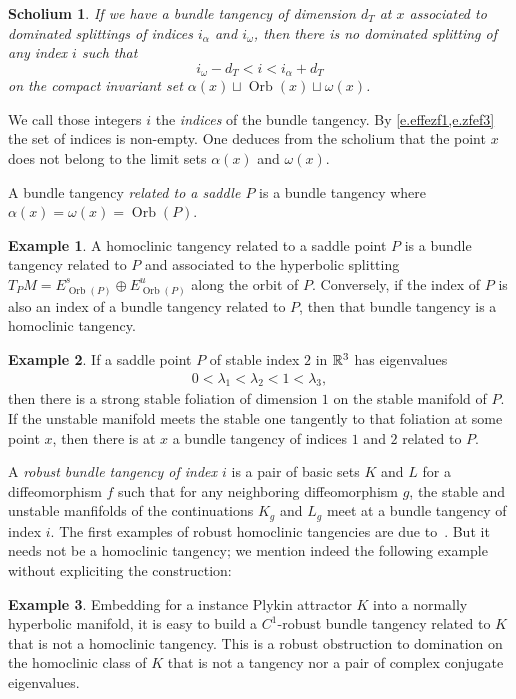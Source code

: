 \documentclass[11pt, a4paper]{amsart}
\theoremstyle{plain}
\newtheorem{scholium}[proposition]{Scholium}
\theoremstyle{definition}
\newtheorem{example}{Example}[proposition]
\theoremstyle{remark}
\numberwithin{equation}{section}         %
\def\Orb{\operatorname{Orb}}
\begin{document}
\begin{scholium}\label{s.gentangency}
If we have a bundle tangency of dimension $d_T$ at $x$ associated to dominated splittings of indices $i_\alpha$ and $i_\omega$, then  there is no dominated splitting of any index $i$ such that 
$$i_\omega-d_T<i<i_\alpha+d_T$$
on the compact invariant set $\alpha(x)\sqcup \Orb(x) \sqcup \omega(x)$.
\end{scholium}

We call those integers $i$ the {\em indices} of the bundle tangency. By \cref{e.effezf1,e.zfef3} the set of indices is non-empty.  One deduces from the scholium that the point $x$ does not belong to the limit sets $\alpha(x)$ and $ \omega(x)$.


A bundle tangency {\em related to a saddle $P$}  is a bundle tangency where $\alpha(x)=\omega(x)=\Orb(P)$.

\begin{example}
A homoclinic tangency related to a saddle point $P$ is a bundle tangency related to $P$ and associated to the hyperbolic splitting $T_PM=E^s_{\Orb(P)}\oplus E^u_{\Orb(P)}$ along the orbit of $P$. Conversely, if the index of $P$ is also an index of a bundle tangency related to $P$, then that bundle tangency is a homoclinic tangency.
\end{example}


\begin{example}
If a saddle point $P$ of stable index $2$ in ${\mathbb R}^3$ has eigenvalues 
\begin{align*}
0<\lambda_1<\lambda_2< 1< \lambda_3,
\end{align*} 
then there is a strong stable foliation of dimension $1$ on the stable manifold of $P$. If the unstable manifold meets the stable one tangently to that foliation at some point $x$, then there is at $x$ a bundle tangency of indices $1$ and $2$ related to $P$.
\end{example}

A {\em robust bundle tangency of index $i$} is a pair of basic sets $K$ and $L$ for a diffeomorphism $f$ such that for any neighboring diffeomorphism $g$, the stable and unstable manfifolds of the continuations $K_g$ and $L_g$ meet at a bundle tangency of index $i$. The first examples of robust homoclinic tangencies are due to~\cite{N1,PV,Ro}. But it needs not be a homoclinic tangency; we mention indeed the following example without expliciting the construction:

\begin{example}
Embedding for a instance Plykin attractor $K$ into a  normally hyperbolic manifold, it is easy to build a $C^1$-robust bundle tangency related to $K$ that is not a homoclinic tangency. This is a robust obstruction to domination on the homoclinic class of $K$ that is not a tangency nor a pair of complex conjugate eigenvalues.
\end{example}
\end{document}
